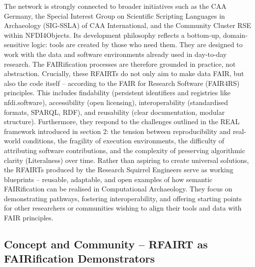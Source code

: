 \documentclass{eceasst}
\begin{document}
The network is strongly connected to broader initiatives such as the CAA Germany, the Special Interest Group on Scientific Scripting Languages in Archaeology (SIG-SSLA) of CAA International, and the Community Cluster RSE within NFDI4Objects. Its development philosophy reflects a bottom-up, domain-sensitive logic: tools are created by those who need them. They are designed to work with the data and software environments already used in day-to-day research. The FAIRification processes are therefore grounded in practice, not abstraction. Crucially, these RFAIRTs do not only aim to make data FAIR, but also the code itself – according to the FAIR for Research Software (FAIR4RS) principles. This includes findability (persistent identifiers and registries like nfdi.software), accessibility (open licensing), interoperability (standardised formats, SPARQL, RDF), and reusability (clear documentation, modular structure). Furthermore, they respond to the challenges outlined in the REAL framework introduced in section 2: the tension between reproducibility and real-world conditions, the fragility of execution environments, the difficulty of attributing software contributions, and the complexity of preserving algorithmic clarity (Literalness) over time. Rather than aspiring to create universal solutions, the RFAIRTs produced by the Research Squirrel Engineers serve as working blueprints – reusable, adaptable, and open examples of how semantic FAIRification can be realised in Computational Archaeology. They focus on demonstrating pathways, fostering interoperability, and offering starting points for other researchers or communities wishing to align their tools and data with FAIR principles.

\subsection{Concept and Community – RFAIRT as FAIRification Demonstrators}\label{sec:31}
\end{document}
